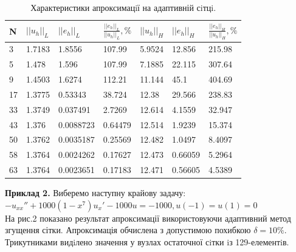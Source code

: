 \documentclass[a4paper]{article}
\numberwithin{equation}{section}
\begin{document}
\begin{table}[H]
\centering
\begin{tabular}{|l|l|l|l|l|l|l|}
\hline
N  & $||u_h||_L$ & $||e_h||_L$ & $\frac{||e_h||_L}{||u_h||_L}, \%$ & $||u_h||_H$ & $||e_h||_H$ & $\frac{||e_h||_H}{||u_h||_H}, \%$   \\ \hline
3  & 1.7183      & 1.8556      & 107.99                            & 5.9524      & 12.856      & 215.98                                     \\ \hline
5  & 1.478       & 1.596       & 107.99                            & 7.1885      & 22.115      & 307.64                            \\ \hline
9  & 1.4503      & 1.6274      & 112.21                            & 11.144      & 45.1        & 404.69                            \\ \hline
17 & 1.3775      & 0.53343     & 38.724                            & 12.38       & 29.566      & 238.83                            \\ \hline
33 & 1.3749      & 0.037491    & 2.7269                            & 12.614      & 4.1559      & 32.947                            \\ \hline
43 & 1.376       & 0.0088723   & 0.64479                           & 12.514      & 1.9239      & 15.374                            \\ \hline
50 & 1.3762      & 0.0035187   & 0.25569                           & 12.482      & 1.0497      & 8.4097                            \\ \hline
58 & 1.3764      & 0.0024262   & 0.17627                           & 12.473      & 0.66059     & 5.2964                            \\ \hline
63 & 1.3764      & 0.0023651   & 0.17183                           & 12.471      & 0.56605     & 4.5389                            \\ \hline
\end{tabular}
\caption{Характеристики апроксимацiї на адаптивній сiтцi.}
\end{table}
\textbf{Приклад 2.} Виберемо наступну крайову задачу:
$-u_{xx}'' + 1000(1-x^7)u_x'-1000u=-1000, u(-1)=u(1)=0$\\
На рис.2 показано результат апроксимації використовуючи адаптивний метод згущення сітки. Апроксимація обчислена з допустимою похибкою $\delta=10\%$. Трикутниками видiлено значення у вузлах остаточної сiтки iз 129-елементiв.
\end{document}
